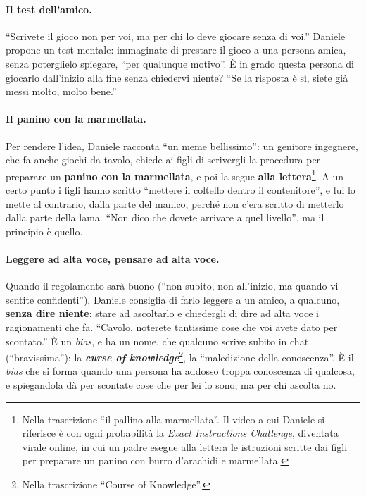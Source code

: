 \paragraph{Il test dell'amico.} ``Scrivete il gioco non per voi, ma per chi lo deve
giocare senza di voi.'' Daniele propone un test mentale: immaginate di prestare il gioco
a una persona amica, senza poterglielo spiegare, ``per qualunque motivo''. È in grado
questa persona di giocarlo dall'inizio alla fine senza chiedervi niente? ``Se la
risposta è sì, siete già messi molto, molto bene.''

\paragraph{Il panino con la marmellata.} Per rendere l'idea, Daniele racconta ``un meme
bellissimo'': un genitore ingegnere, che fa anche giochi da tavolo, chiede ai figli di
scrivergli la procedura per preparare un \textbf{panino con la marmellata}, e poi la
segue \textbf{alla lettera}\footnote{Nella trascrizione ``il pallino alla marmellata''.
Il video a cui Daniele si riferisce è con ogni probabilità la \emph{Exact Instructions
Challenge}, diventata virale online, in cui un padre esegue alla lettera le istruzioni
scritte dai figli per preparare un panino con burro d'arachidi e marmellata.}. A un
certo punto i figli hanno scritto ``mettere il coltello dentro il contenitore'', e lui lo
mette al contrario, dalla parte del manico, perché non c'era scritto di metterlo dalla
parte della lama. ``Non dico che dovete arrivare a quel livello'', ma il principio è
quello.

\paragraph{Leggere ad alta voce, pensare ad alta voce.} Quando il regolamento sarà
buono (``non subito, non all'inizio, ma quando vi sentite confidenti''), Daniele consiglia
di farlo leggere a un amico, a qualcuno, \textbf{senza dire niente}: stare ad ascoltarlo
e chiedergli di dire ad alta voce i ragionamenti che fa. ``Cavolo, noterete tantissime
cose che voi avete dato per scontato.'' È un \emph{bias}, e ha un nome, che qualcuno
scrive subito in chat (``bravissima''): la \textbf{\emph{curse of knowledge}}\footnote{Nella
trascrizione ``Course of Knowledge''.}, la ``maledizione della conoscenza''. È il
\emph{bias} che si forma quando una persona ha addosso troppa conoscenza di qualcosa, e
spiegandola dà per scontate cose che per lei lo sono, ma per chi ascolta no.

